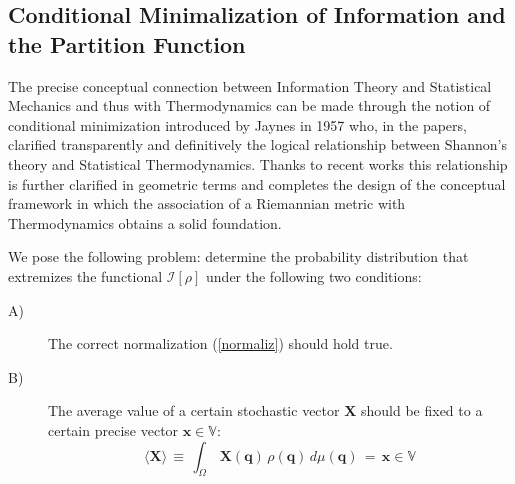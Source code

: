 \documentclass[10pt,a4paper]{article}
\begin{document}
\subsection{Conditional Minimalization of Information and the Partition Function}\label{parcondicio}
The precise conceptual connection between Information Theory and Statistical Mechanics and thus with Thermodynamics can be made through the notion of conditional minimization introduced by Jaynes in 1957 who, in the papers\cite{gianno1,gianno2}, clarified transparently and definitively the logical relationship between Shannon's theory and Statistical Thermodynamics. Thanks to recent works \cite{lychaginlecture,ludaed,ludaed2,Lychagin_2020,Kushner_2020}
this relationship is further clarified in geometric terms and completes the design of the conceptual framework
in which the association of a Riemannian metric with Thermodynamics obtains a solid foundation.
\par
We pose the following problem: determine the probability distribution that extremizes the functional
$\mathcal{I}\left[\rho\right]$ under the following two conditions:
\begin{description}
  \item[A)] The correct normalization (\ref{normaliz}) should hold true.
  \item[B)] The average value of a certain stochastic vector $\mathbf{X}$
  should be fixed to a certain precise vector $\mathbf{x}\in
  \mathbb{V}$:
  \begin{equation}\label{muccacarolina}
    \langle \mathbf{X}\rangle \, \equiv \, \int_{\Omega}
    \,\mathbf{X}(\mathbf{q})\, \rho({\mathbf{q}})\,d\mu(\mathbf{q}) \, =
    \,\mathbf{x}\in\mathbb{V}
  \end{equation}
\end{description}
\end{document}

